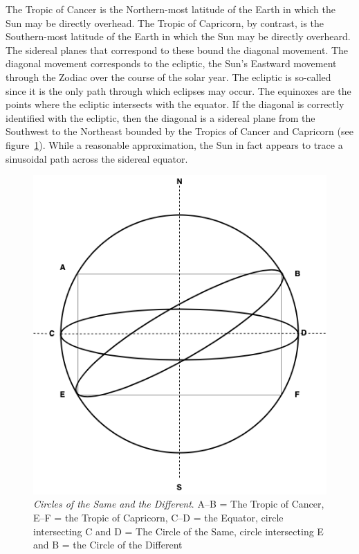 The Tropic of Cancer is the Northern-most latitude of the Earth in which the Sun may be directly overhead. The Tropic of Capricorn, by contrast, is the Southern-most latitude of the Earth in which the Sun may be directly overheard. The sidereal planes that correspond to these bound the diagonal movement. The diagonal movement corresponds to the ecliptic, the Sun's Eastward movement through the Zodiac over the course of the solar year. The ecliptic is so-called since it is the only path through which eclipses may occur. The equinoxes are the points where the ecliptic intersects with the equator. If the diagonal is correctly identified with the ecliptic, then the diagonal is a sidereal plane from the Southwest to the Northeast bounded by the Tropics of Cancer and Capricorn (see figure~\ref{fig:cirlces}). While a reasonable approximation, the Sun in fact appears to trace a sinusoidal path across the sidereal equator.

\begin{figure}[htbp]
	\centering
		\includegraphics[scale=0.5]{graphics/circles.png}
	\caption{\emph{Circles of the Same and the Different}. A--B = The Tropic of Cancer, E--F = the Tropic of Capricorn, C--D = the Equator, circle intersecting C and D = The Circle of the Same, circle intersecting E and B = the Circle of the Different}
	\label{fig:cirlces}
\end{figure}

